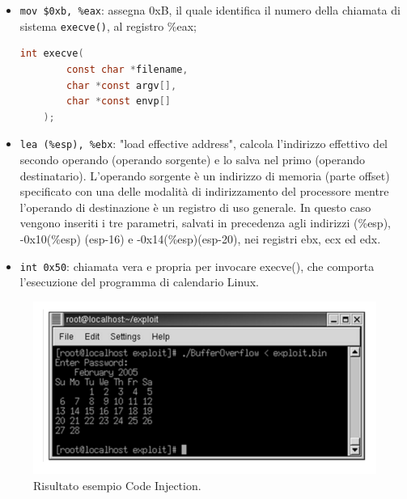 \begin{itemize}
    \item \verb|mov $0xb, %eax|: assegna 0xB, il quale identifica il numero della chiamata
          di sistema \verb|execve()|, al registro \%eax; \\
          \begin{lstlisting}[language=C]
    int execve(
        const char *filename, 
        char *const argv[], 
        char *const envp[]
    );\end{lstlisting}
    \item \verb|lea (%esp), %ebx|: "load effective address", calcola l'indirizzo
          effettivo del secondo operando (operando sorgente) e lo salva nel primo (operando destinatario).
          L'operando sorgente è un indirizzo di memoria (parte offset) specificato con una delle
          modalità di indirizzamento del processore mentre l'operando di destinazione è un
          registro di uso generale. In questo caso vengono inseriti i tre parametri,
          salvati in precedenza agli
          indirizzi (\%esp), -0x10(\%esp) (esp-16) e -0x14(\%esp)(esp-20), nei registri
          ebx, ecx ed edx.
          \item\verb|int 0x50|: chiamata vera e propria  per invocare execve(), che
          comporta l'esecuzione del programma di calendario Linux.
\end{itemize}

\begin{figure}[H]
    \centering
    \includegraphics[width=12cm, keepaspectratio]{capitoli/secure_coding/img/cap_2/risultato_ex_pass_code_inj.png}
    \caption{Risultato esempio Code Injection.}\label{fig:ris_es_pass_ok_code_inj}
\end{figure}




